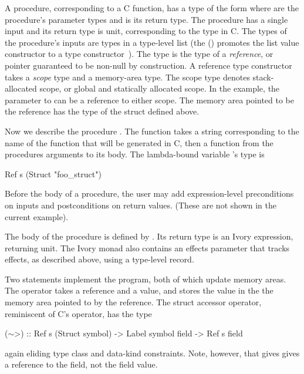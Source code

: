 A procedure, corresponding to a C function, has a type of the form
where  are the procedure's parameter types and  is its return
type.  The procedure  has a single input and its return type is
unit, corresponding to the  type in C.  The types of the procedure's
inputs are types in a type-level list (the () promotes the list value
constructor to a type constructor~\cite{datakinds}).  The type
is the type of a \emph{reference}, or pointer guaranteed to be non-null by
construction.  A reference type constructor takes a \emph{scope} type and a
memory-area type.  The scope type denotes stack-allocated scope, or global and
statically allocated scope.  In the example, the parameter to  can
be a reference to either scope.  The memory area pointed to be the reference
has the type of the struct defined above.

Now we describe the procedure .  The function  takes a
string corresponding to the name of the function that will be generated in C,
then a function from the procedures arguments to its body.  The lambda-bound
variable 's type is
\begin{code}
Ref s (Struct "foo\_struct")
\end{code}
\noindent
Before the body of a procedure, the user may add expression-level preconditions
on inputs and postconditions on return values. (These are not shown in the
current example).

The body of the procedure is defined by .  Its return type is an Ivory
expression, returning unit.  The Ivory monad also contains an effects parameter
that tracks effects, as described above, using a type-level record.

\newcommand{\mytilde}{\raise.17ex\hbox{$\scriptstyle\mathtt{\sim}$}}

Two statements implement the program, both of which update memory areas.  The
 operator takes a reference and a value, and stores the value in the
the memory area pointed to by the reference.  The struct accessor operator,
reminiscent of C's \cd{->} operator, has the type
\begin{code}
(\(\sim\)>) :: Ref s (Struct symbol)
      -> Label symbol field -> Ref s field
\end{code}
\noindent
again eliding type class and data-kind constraints.  Note, however, that
gives \cd{\mytilde{}>} gives a reference to the field, not the field value.

